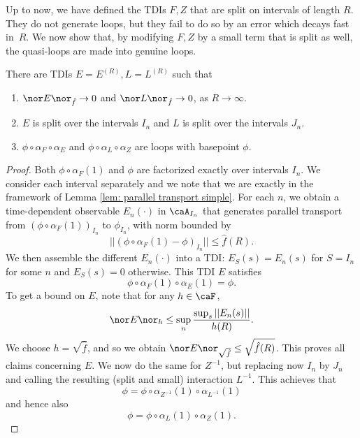 Up to now, we have defined the TDIs $F,Z$ that are split on intervals of length $R$. They do not generate loops, but they fail to do so by an error which decays fast in~$R$. We now show that, by modifying $F,Z$ by a small term that is split as well, the quasi-loops are made into genuine loops.
\begin{lemma}\label{lem: closure quasi loops}
	There are TDIs $E=E^{(R)},L=L^{(R)}$ such that 
	\begin{enumerate}
		\item  $\nor E \nor_{\hat{f}}\to 0 $ and $\nor L \nor_{\hat{f}}\to 0 $, as $R\to\infty$.
		\item  $E$ is split over the intervals $I_n$ and $L$ is split over the intervals $J_n$.
		\item  $\phi \circ  \alpha_{F} \circ \alpha_{E}$  and $\phi  \circ \alpha_{L} \circ \alpha_{Z}$ are loops with basepoint $\phi$.
	\end{enumerate}
\end{lemma}
\begin{proof}
	Both $\phi \circ \alpha_{F}(1)$ and $\phi$ are factorized exactly over intervals $I_n$. We consider each interval separately and we note that we are exactly in the framework of Lemma \ref{lem: parallel transport simple}. For each $n$, we obtain a time-dependent observable $E_{n}(\cdot)$ in $ \caA_{I_n}$
	that generates parallel transport from $(\phi \circ \alpha_{F}(1))_{I_n}$ to $\phi_{I_n}$, with norm bounded by 
	$$
	|| (\phi \circ \alpha_{F}(1)-\phi)_{I_n}    || \leq  \hat{f}(R).
	$$
	We then assemble the different $E_n(\cdot)$ into a TDI:  $
	E_S(s)= E_n(s) $ for $S=I_n$ for some $n$ and $E_S(s)=0$ otherwise. 
	This TDI $E$ satisfies
	$$
	\phi \circ \alpha_{F}(1) \circ \alpha_E(1)=\phi.
	$$
	To get a bound on $E$, note that for any $h \in \caF$,
	\begin{equation}\label{E epsilon}
		\nor E \nor_h\leq \sup_n \frac{\sup_{s}||E_n(s)||}{h(R)}.
	\end{equation}
	We choose $h=\sqrt{\hat{f}}$, and so we obtain $\nor E \nor_{\sqrt{\hat{f}}}\leq \sqrt{\hat{f}(R)}$. This proves all claims concerning $E$.
	We now do the same for $Z^{-1}$, but replacing now $I_n$ by $J_n$ and calling the resulting (split and small) interaction $L^{-1}$. This achieves that
	$$
	\phi = \phi  \circ \alpha_{Z^{-1}}(1) \circ \alpha_{L^{-1}}(1) 
	$$
	and hence also 
	$$
	\phi = \phi  \circ \alpha_{L}(1) \circ \alpha_{Z}(1).
	$$
\end{proof}


